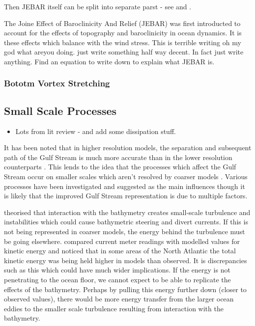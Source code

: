 \documentclass[..\EOYR.tex]{subfiles}
\begin{document}
Then JEBAR itself can be split into separate parst - see \citep{Greatbatch1991} and \citep{Gula2014}.\\



The Joine Effect of Baroclinicity And Relief (JEBAR) was first introducted to account for the effects of topography and baroclinicity in ocean dynamics. It is these effects which balance with the wind stress. This is terrible writing oh my god what areyou doing. just write something half way decent. In fact just write anything. Find an equation to write down to explain what JEBAR is.

\subsubsection*{Bototm Vortex Stretching}

\subsection{Small Scale Processes}
\begin{itemize}
    \item Lots from lit review - and add some dissipation stuff.
\end{itemize}


It has been noted that in higher resolution models, the separation and subsequent path of the Gulf Stream is much more accurate than in the lower resolution counterparts \citep{Hurlburt2008}\citep{Zhang2007}. This lends to the idea that the processes which affect the Gulf Stream occur on smaller scales which aren't resolved by coarser models \citep{NaveiraGarabato2013}\citep{Nikurashin2012a}. Various processes have been investigated and suggested as the main influences though it is likely that the improved Gulf Stream representation is due to multiple factors.


\citep{NaveiraGarabato2013} theorised that interaction with the bathymetry creates small-scale turbulence and instabilities which could cause bathymetric steering and divert currents. If this is not being represented in coarser models, the energy behind the turbulence must be going elsewhere. \citep{Scott2010} compared current meter readings with modelled values for kinetic energy and noticed that in some areas of the North Atlantic the total kinetic energy was being held higher in models than observed. It is discrepancies such as this which could have much wider implications. If the energy is not penetrating to the ocean floor, we cannot expect to be able to replicate the effects of the bathymetry. Perhaps by pulling this energy further down (closer to observed values), there would be more energy transfer from the larger ocean eddies to the smaller scale turbulence resulting from interaction with the bathymetry.
\end{document}
